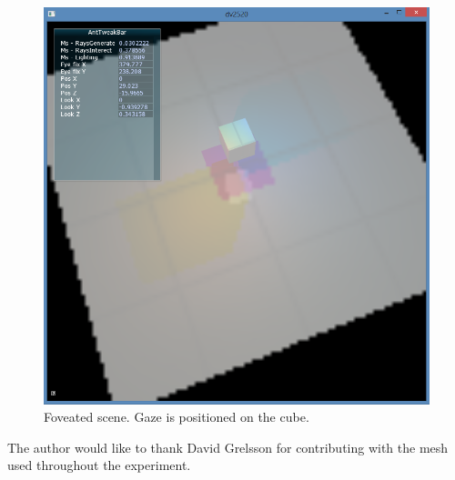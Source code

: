 \begin{figure}[h]
  \centering
  \includegraphics[width=0.85\linewidth]{img/fov_rt_et.png}
  \caption{Foveated scene. Gaze is positioned on the cube.}
  \label{fig:fov}
\end{figure}

\noindent
The author would like to thank David Grelsson for contributing with the mesh used throughout the experiment.
